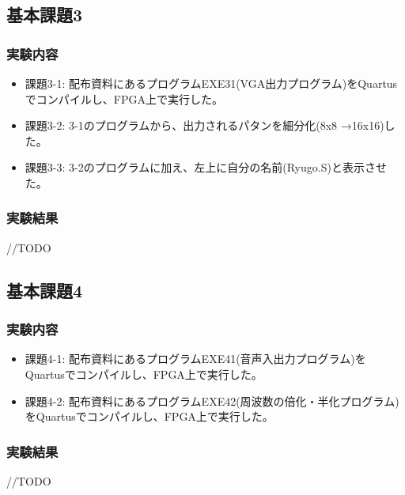 \subsection*{基本課題3}
\subsubsection*{実験内容}
\begin{itemize}
    \item 課題3-1: 配布資料にあるプログラムEXE31(VGA出力プログラム)をQuartusでコンパイルし、FPGA上で実行した。
    \item 課題3-2: 3-1のプログラムから、出力されるパタンを細分化(8x8 →16x16)した。
    \item 課題3-3: 3-2のプログラムに加え、左上に自分の名前(Ryugo.S)と表示させた。
\end{itemize}
\subsubsection*{実験結果}
//TODO

\subsection*{基本課題4}
\subsubsection*{実験内容}
\begin{itemize}
    \item 課題4-1: 配布資料にあるプログラムEXE41(音声入出力プログラム)をQuartusでコンパイルし、FPGA上で実行した。
    \item 課題4-2: 配布資料にあるプログラムEXE42(周波数の倍化・半化プログラム)をQuartusでコンパイルし、FPGA上で実行した。
\end{itemize}
\subsubsection*{実験結果}
//TODO